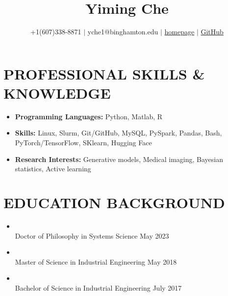 \documentclass[10pt]{article}
\title{\bf  Yiming Che \vspace{-0.6em}}
\author{+1(607)338-8871 $\vert$ yche1@binghamton.edu $\vert$ \href{https://soloche.github.io}{homepage} $\vert$ \href{https://github.com/SoloChe}{GitHub}}
\date{}
\begin{document}
	\maketitle

\vspace{-5em}
\section*{PROFESSIONAL SKILLS \& KNOWLEDGE}
\vspace{-0.5em}
 \begin{itemize}
	\setlength\itemsep{0.5pt}
 	\item {\bf Programming Languages:} Python, Matlab, R
 	\item {\bf Skills:} Linux, Slurm, Git/GitHub, MySQL, PySpark, Pandas, Bash, PyTorch/TensorFlow, SKlearn, Hugging Face
 	\item {\bf Research Interests:} Generative models, Medical imaging, Bayesian statistics, Active learning
 \end{itemize}

\vspace{-2em}
\section*{EDUCATION BACKGROUND}
\vspace{-0.5em}
\begin{itemize}
	\setlength\itemsep{0.5pt}

	\item {}                                                           
	\\Doctor of Philosophy in Systems Science \hfill May 2023 

	\item {}                                                           
	\\Master of Science in Industrial Engineering \hfill  May 2018

    \item {}
    \\Bachelor of Science in Industrial Engineering \hfill July 2017 
\end{itemize}
\end{document}
